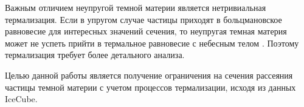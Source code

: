 Важным отличием неупругой темной материи является нетривиальная термализация. Если в упругом случае частицы приходят в больцмановское равновесие для интересных значений сечения, то неупругая темная материя может не успеть прийти в термальное равновесие с небесным телом \cite{Blennow_2018}. Поэтому термализация требует более детального анализа.

Целью данной работы является получение ограничения на сечения рассеяния частицы темной материи с учетом процессов термализации, исходя из данных IceCube.

